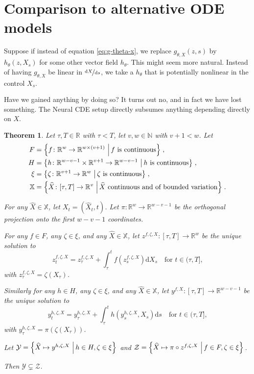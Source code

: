 \documentclass{article}
\theoremstyle{plain}
\newtheorem{thm}{Theorem}[section]
\theoremstyle{definition}
\newcommand{\reals}{\mathbb{R}}
\newcommand{\naturals}{\mathbb{N}}
\newcommand{\ttfrac}[2]{\nicefrac{#1}{#2}}
\newcommand{\set}[2]{\left\{{#1}\,\left\vert\,{#2}\vphantom{{#1}}\right\}\right.}
\begin{document}
	\section{Comparison to alternative ODE models}\label{appendix:nonlinear-g}
	Suppose if instead of equation \eqref{eq:g-theta-x}, we replace $g_{\theta, X}(z, s)$ by $h_{\theta}(z, X_s)$ for some other vector field $h_\theta$. This might seem more natural. Instead of having $g_{\theta, X}$ be linear in $\ttfrac{\mathrm{d}X}{\mathrm{d}s}$, we take a $h_\theta$ that is potentially nonlinear in the control $X_s$.
	
	Have we gained anything by doing so? It turns out no, and in fact we have lost something. The Neural CDE setup directly subsumes anything depending directly on $X$.
	
	\begin{thm}\label{cont-rnn-thm}
	Let $\tau, T \in \reals$ with $\tau < T$, let $v, w \in \naturals$ with $v + 1 < w$. Let
	\begin{align*}
	F &= \set{f \colon \reals^w \to \reals^{w \times (v + 1)}}{f \text{ is continuous}},\\
	H &= \set{h \colon \reals^{w - v - 1} \times \reals^{v + 1} \to \reals^{w - v - 1}}{h \text{ is continuous}},\\
	\xi&= \set{\zeta \colon \reals^{v + 1} \to \reals^w}{\zeta \text{ is continuous}},\\
	\mathbb{X}&= \set{\widehat{X} \colon [\tau, T] \to \reals^v}{\widehat{X} \text{ continuous and of bounded variation}}.
	\end{align*}
	
	For any $\widehat{X} \in \mathbb{X}$, let $X_t = (\widehat{X}_t, t)$. Let $\pi \colon \reals^w \to \reals^{w - v - 1}$ be the orthogonal projection onto the first $w - v - 1$ coordinates.
	
	For any $f \in F$, any $\zeta \in \xi$, and any $\widehat{X} \in \mathbb{X}$, let $z^{f, \zeta, X} \colon [\tau, T] \to \reals^w$ be the unique solution to
	\begin{equation*}
	z^{f, \zeta, X}_t = z^{f, \zeta, X}_\tau + \int_\tau^t f(z^{f, \zeta, X}_s) \mathrm{d} X_s\quad\text{for $t \in (\tau, T]$,}
	\end{equation*}
	with $z^{f, \zeta, X}_\tau = \zeta(X_\tau)$.
	
	Similarly for any $h \in H$, any $\zeta \in \xi$, and any $\widehat{X} \in \mathbb{X}$, let $y^{f, X} \colon [\tau, T] \to \reals^{w - v - 1}$ be the unique solution to
	\begin{equation*}
	y^{h, \zeta, X}_t = y^{h, \zeta, X}_\tau + \int_\tau^t h(y^{h, \zeta, X}_s, X_s) \mathrm{d}s\quad\text{for $t \in (\tau, T]$,}
	\end{equation*}
	with $y^{h, \zeta, X}_\tau = \pi(\zeta(X_\tau))$.
	
	Let $\mathcal{Y} = \set{\widehat{X} \mapsto y^{h, \zeta, X}}{h \in H, \zeta \in \xi}$ and $\mathcal{Z} = \set{\widehat{X} \mapsto \pi \circ z^{f, \zeta, X}}{f \in F, \zeta \in \xi}$.
	
	Then $\mathcal{Y} \subsetneq \mathcal{Z}$.
	\end{thm}
	
\end{document}
